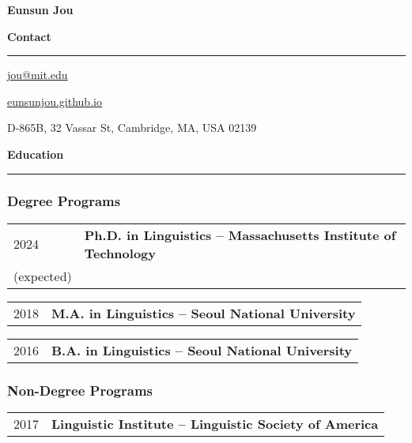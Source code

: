 \documentclass[12pt]{article}
\newcommand{\sect}[1]{{\fontsize{15}{30}\selectfont \textbf{#1}} {\vspace{0.1cm}} \hrule {\vspace{0.3cm}}}
\begin{document}
\begin{center}
{\Large \textbf{Eunsun Jou}}
\end{center}

\thispagestyle{firstpage}

\sect{Contact}

\href{mailto:jou@mit.edu}{jou@mit.edu}

\href{eunsunjou.github.io}{eunsunjou.github.io}

D-865B, 32 Vassar St, Cambridge, MA, USA 02139

\vspace{1cm}

\sect{Education}

\subsubsection*{Degree Programs}
\begin{tabular}{p{}|p{}}
    {2024}&{\textbf{Ph.D. in Linguistics -- Massachusetts Institute of Technology}}\\
    {(expected)}&{}\\
\end{tabular}

\vspace{0.2cm}

\begin{tabular}{p{}|p{}}
	{2018}&{\textbf{M.A. in Linguistics -- Seoul National University}}\\
 \end{tabular}

\vspace{0.2cm}

\begin{tabular}{p{}|p{}}
   {2016}&{\textbf{B.A. in Linguistics -- Seoul National University}}\\
\end{tabular}

\subsubsection*{Non-Degree Programs}
\begin{tabular}{p{}|p{}}
	{2017}&{\textbf{Linguistic Institute -- Linguistic Society of America}}\\
\end{tabular}
\end{document}
